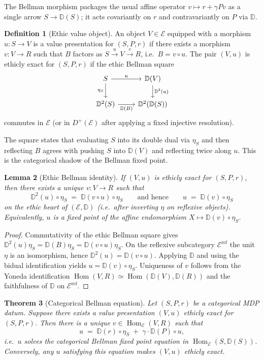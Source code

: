 \documentclass[12pt]{article}
\newcommand{\E}{\mathcal{E}}
\newcommand{\DD}{\mathbb{D}}
\newcommand{\Hom}{\operatorname{Hom}}
\theoremstyle{plain}
\newtheorem{theorem}{Theorem}[section]
\newtheorem{lemma}[theorem]{Lemma}
\theoremstyle{definition}
\newtheorem{definition}[theorem]{Definition}
\theoremstyle{remark}
\numberwithin{equation}{section}
\begin{document}
The Bellman morphism packages the usual affine operator $v\mapsto r+\gamma P v$ as a single arrow $S\to \DD(S)$; it acts covariantly on $r$ and contravariantly on $P$ via $\DD$.

\begin{definition}[Ethic value object]
An object $V\in \E$ equipped with a morphism $u: S\to V$ is a value presentation for $(S,P,r)$ if there exists a morphism $v:V\to R$ such that $B$ factors as $S\xrightarrow{u}V\xrightarrow{v}R$, i.e.\ $B=v\circ u$. The pair $(V,u)$ is ethicly exact for $(S,P,r)$ if the ethic Bellman square
\[
\begin{tikzcd}
S \arrow[r,"u"] \arrow[d,"\eta_S"'] & \DD(V) \arrow[d,"\DD^2(u)"] \\
\DD^2(S) \arrow[r,"\DD(B)"'] & \DD^2(\DD(S))
\end{tikzcd}
\]
commutes in $\E$ (or in $D^{+}(\E)$ after applying a fixed injective resolution).
\end{definition}

The square states that evaluating $S$ into its double dual via $\eta_S$ and then reflecting $B$ agrees with pushing $S$ into $\DD(V)$ and reflecting twice along $u$. This is the categorical shadow of the Bellman fixed point.

\begin{lemma}[Ethic Bellman identity]\label{lem:EthBell}
If $(V,u)$ is ethicly exact for $(S,P,r)$, then there exists a unique $v:V\to R$ such that
\[
\DD^2(u)\circ \eta_S \;=\; \DD(v\circ u)\circ \eta_S
\qquad\text{and hence}\qquad
u \;=\; \DD(v)\circ \eta_S
\]
on the ethic heart of $(\E,\DD)$ (i.e.\ after inverting $\eta$ on reflexive objects). Equivalently, $u$ is a fixed point of the affine endomorphism $X\mapsto \DD(v)\circ \eta_S$.
\end{lemma}

\begin{proof}
Commutativity of the ethic Bellman square gives $\DD^2(u)\eta_S=\DD(B)\eta_S=\DD(v\circ u)\eta_S$. On the reflexive subcategory $\E^{\mathrm{ref}}$ the unit $\eta$ is an isomorphism, hence $\DD^2(u)=\DD(v\circ u)$. Applying $\DD$ and using the bidual identification yields $u=\DD(v)\circ \eta_S$. Uniqueness of $v$ follows from the Yoneda identification $\Hom(V,R)\simeq \Hom(\DD(V),\DD(R))$ and the faithfulness of $\DD$ on $\E^{\mathrm{ref}}$.
\end{proof}

\begin{theorem}[Categorical Bellman equation]\label{thm:CatBellman}
Let $(S,P,r)$ be a categorical MDP datum. Suppose there exists a value presentation $(V,u)$ ethicly exact for $(S,P,r)$. Then there is a unique $v\in \Hom_{\E}(V,R)$ such that
\[
u \;=\; \DD(r)\circ \eta_S\;+\; \gamma\cdot \DD(P)\circ u,
\]
i.e.\ $u$ solves the categorical Bellman fixed point equation in $\Hom_{\E}(S,\DD(S))$. Conversely, any $u$ satisfying this equation makes $(V,u)$ ethicly exact.
\end{theorem}
\end{document}
